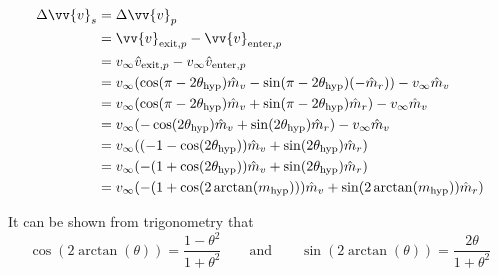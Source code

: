 \documentclass[../basicOrbitalDynamics.tex]{subfiles}
\begin{document}
\begin{align*}
    \Delta\vv{v}_s & = \Delta\vv{v}_p                                                                                             \\
                   & = \vv{v}_{\text{exit},p}-\vv{v}_{\text{enter},p}                                                             \\
                   & = v_\infty\hat{v}_{\text{exit},p}-v_\infty\hat{v}_{\text{enter},p}                                           \\
                   & = v_\infty(\cos(\pi-2\st{\theta}{hyp})\hat{m}_v-\sin(\pi-2\st{\theta}{hyp})(-\hat{m}_r))-v_\infty\hat{m}_v \\
                   & = v_\infty(\cos(\pi-2\st{\theta}{hyp})\hat{m}_v+\sin(\pi-2\st{\theta}{hyp})\hat{m}_r)-v_\infty\hat{m}_v    \\
                   & = v_\infty(-\cos(2\st{\theta}{hyp})\hat{m}_v+\sin(2\st{\theta}{hyp})\hat{m}_r)-v_\infty\hat{m}_v           \\
                   & = v_\infty((-1-\cos(2\st{\theta}{hyp}))\hat{m}_v+\sin(2\st{\theta}{hyp})\hat{m}_r)                         \\
                   & = v_\infty(-(1+\cos(2\st{\theta}{hyp}))\hat{m}_v+\sin(2\st{\theta}{hyp})\hat{m}_r)                         \\
                   & = v_\infty(-(1+\cos(2\arctan(\st{m}{hyp})))\hat{m}_v+\sin(2\arctan(\st{m}{hyp}))\hat{m}_r)                 \\
\end{align*}

It can be shown from trigonometry that
\[\cos(2\arctan(\theta))=\frac{1-\theta^2}{1+\theta^2}\qquad\text{and}\qquad\sin(2\arctan(\theta))=\frac{2\theta}{1+\theta^2}\]

\end{document}
